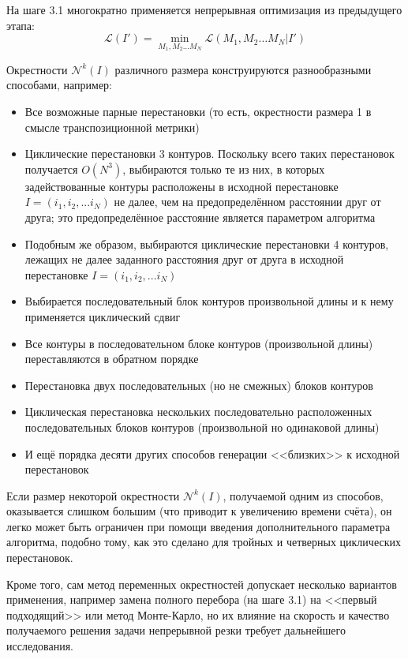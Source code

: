 \documentclass[14pt]{extarticle}
\theoremstyle{plain}%
\theoremstyle{remark}
\begin{document}
На шаге 3.1
многократно применяется
непрерывная оптимизация из предыдущего этапа:
$$
\mathcal L (I') = \min_{M_1, M_2 \dots M_N}
  \mathcal L (M_1, M_2 \dots M_N | I')
$$

Окрестности
$\mathcal N^k(I)$
различного размера
конструируются разнообразными способами,
например:

\begin{itemize}
  \item
  Все возможные парные перестановки
  (то есть, окрестности размера 1 в смысле транспозиционной метрики)
  \item
  Циклические перестановки 3 контуров.
  Поскольку всего таких перестановок получается
  $O (N ^ 3)$,
  выбираются только те из них,
  в которых задействованные контуры расположены
  в исходной перестановке
  $I = (i_1, i_2, ... i_N)$
  не далее, чем на предопределённом расстоянии
  друг от друга;
  это предопределённое расстояние является
  параметром алгоритма
  \item
  Подобным же образом,
  выбираются циклические перестановки 4 контуров,
  лежащих не далее заданного расстояния
  друг от друга в исходной перестановке
  $I = (i_1, i_2, ... i_N)$
  \item
  Выбирается последовательный блок контуров
  произвольной длины и к нему применяется
  циклический сдвиг
  \item
  Все контуры в последовательном блоке
  контуров
  (произвольной длины)
  переставляются в обратном порядке
  \item
  Перестановка двух последовательных
  (но не смежных) блоков контуров
  \item
  Циклическая перестановка нескольких
  последовательно расположенных
  последовательных блоков контуров
  (произвольной но одинаковой длины)
  \item
  И ещё порядка десяти других способов генерации
  <<близких>> к исходной перестановок
\end{itemize}

Если размер некоторой окрестности
$\mathcal N^k(I)$,
получаемой одним из способов,
оказывается слишком большим
(что приводит к увеличению времени счёта),
он легко может быть ограничен
при помощи введения дополнительного параметра
алгоритма,
подобно тому,
как это сделано для тройных
и четверных циклических перестановок.

Кроме того,
сам метод переменных окрестностей
допускает несколько вариантов применения,
например замена полного перебора
(на шаге 3.1)
на <<первый подходящий>>
или метод Монте-Карло,
но их влияние на скорость
и качество получаемого решения
задачи непрерывной резки
требует дальнейшего исследования.
\end{document}
